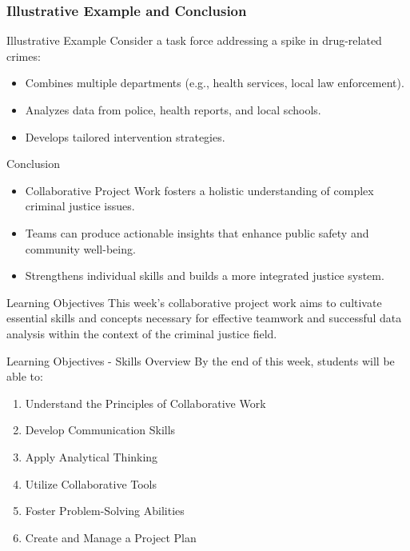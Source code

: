 \documentclass[aspectratio=169]{beamer}
\begin{document}
\begin{frame}[fragile]
    \frametitle{Illustrative Example and Conclusion}
    \begin{block}{Illustrative Example}
        Consider a task force addressing a spike in drug-related crimes:
        \begin{itemize}
            \item Combines multiple departments (e.g., health services, local law enforcement).
            \item Analyzes data from police, health reports, and local schools.
            \item Develops tailored intervention strategies.
        \end{itemize}
    \end{block}
    \begin{block}{Conclusion}
        \begin{itemize}
            \item Collaborative Project Work fosters a holistic understanding of complex criminal justice issues.
            \item Teams can produce actionable insights that enhance public safety and community well-being.
            \item Strengthens individual skills and builds a more integrated justice system.
        \end{itemize}
    \end{block}
\end{frame}

\begin{frame}[fragile]{Learning Objectives}
    This week’s collaborative project work aims to cultivate essential skills and concepts necessary for effective teamwork and successful data analysis within the context of the criminal justice field. 
\end{frame}

\begin{frame}[fragile]{Learning Objectives - Skills Overview}
    By the end of this week, students will be able to:
    \begin{enumerate}
        \item Understand the Principles of Collaborative Work
        \item Develop Communication Skills
        \item Apply Analytical Thinking
        \item Utilize Collaborative Tools
        \item Foster Problem-Solving Abilities
        \item Create and Manage a Project Plan
    \end{enumerate}
\end{frame}
\end{document}
